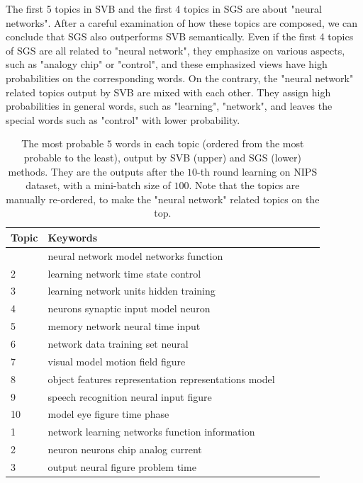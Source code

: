 \documentclass{article}
\begin{document}
The first 5 topics in SVB and the first 4 topics in SGS are about "neural networks". After a careful examination of how these topics are composed, we can conclude that SGS also outperforms SVB semantically. Even if the first 4 topics of SGS are all related to "neural network", they emphasize on various aspects, such as "analogy chip" or "control", and these emphasized views have high probabilities on the corresponding words. On the contrary, the "neural network" related topics output by SVB are mixed with each other. They assign high probabilities in general words, such as "learning", "network", and leaves the special words such as "control" with lower probability. 

\begin{table}[t]
\caption{The most probable $5$ words in each topic (ordered from the most probable to the least), output by SVB (upper) and SGS (lower) methods. They are the outputs after the $10$-th round learning on NIPS dataset, with a mini-batch size of $100$. Note that the topics are manually re-ordered, to make the "neural network" related topics on the top.}
\label{tbl:sample_topics}
\vskip 0.15in
\begin{center}
\begin{small}
\begin{tabular}{llllll}
\hline
\abovespace\belowspace
{\sc Topic} & {\sc Keywords} \\
\hline
\abovespace
1 &  neural network model networks function \\
 2 & learning network time state control \\
 3 & learning network units hidden training \\
 4 & neurons synaptic input model neuron \\
 5 & memory network neural time input  \\
 6 & network data training set neural \\
 7 & visual model motion field figure \\
 8 & object features representation representations model\\
 9 & speech recognition neural input figure \\
 10 & model eye figure time phase\\
\hline
\hline
1 & network learning networks function information \\
2 & neuron neurons chip analog current\\
3 & output neural figure problem time \\

\end{tabular}
\end{small}
\end{center}
\end{table}
\end{document}

